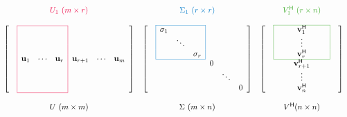 \begin{align*} %
\begin{array}{cccc}
\textcolor{red}{U_1\ (m \times r)} & \textcolor{blue}{\Sigma_1\ (r \times r)} & \textcolor{green}{V\hrm_1\ (r \times n)} \\ \\
\left[\begin{array}{ccccccc}
\arrayrulecolor{red}
\cline{2-4}
& \lvl{}     &        & \rvl{}     &          &        &      \\
& \lvl{}     &        & \rvl{}     &          &        &      \\
& \lvl{}     &        & \rvl{}     &          &        &      \\
& \lvl{\u_1} & \cdots & \rvl{\u_r} & \u_{r+1} & \cdots & \u_m \\
& \lvl{}     &        & \rvl{}     &          &        &      \\
& \lvl{}     &        & \rvl{}     &          &        &      \\
& \lvl{}     &        & \rvl{}     &          &        &      \\
\cline{2-4}
\end{array}\right]
&
\left[\begin{array}{cccccccc}
\arrayrulecolor{blue}
\cline{2-4}
& \lvl{\sigma_{1}}  &   & \rvl{}         &   &        &   \\
& \lvl{}       & \ddots & \rvl{}         &   &        &   \\
& \lvl{}       &        & \rvl{\sigma_{r}} & &        &   \\
\cline{2-4}
&              &        &                & 0 &        &   \\
&              &        &                &   & \ddots &   \\
&              &        &                &   &        & 0 \\
\end{array}\right]
&
\left[\begin{array}{ccccccc}
\arrayrulecolor{green}
\cline{2-6}
& \lvl{} & & \v\hrm_1 & & \rvl{} & \\
& \lvl{} & & \vdots   & & \rvl{} & \\
& \lvl{} & & \v\hrm_r & & \rvl{} & \\
\cline{2-6}
& & & \v\hrm_{r+1} & & & \\
& & & \vdots       & & & \\
& & & \v\hrm_n     & & & \\
\end{array}\right]
\\ \\
U\ (m \times m) & \Sigma\ (m \times n) & V\hrm (n \times n) \\
\end{array}
\end{align*}

